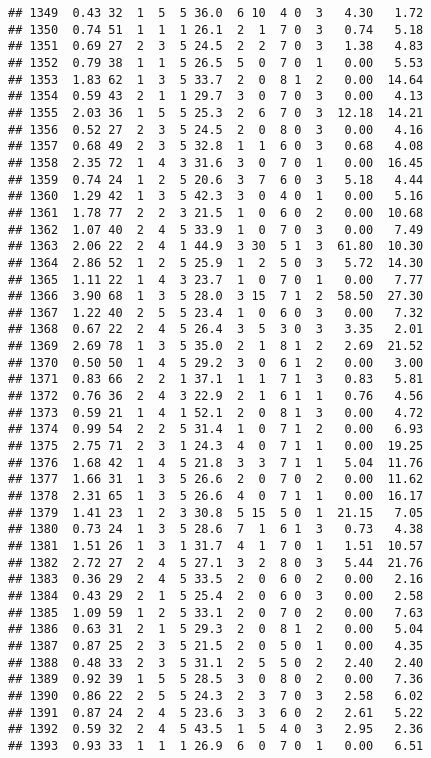\documentclass[
]{article}
\begin{document}
\begin{verbatim}
## 1349  0.43 32  1  5  5 36.0  6 10  4 0  3   4.30   1.72
## 1350  0.74 51  1  1  1 26.1  2  1  7 0  3   0.74   5.18
## 1351  0.69 27  2  3  5 24.5  2  2  7 0  3   1.38   4.83
## 1352  0.79 38  1  1  5 26.5  5  0  7 0  1   0.00   5.53
## 1353  1.83 62  1  3  5 33.7  2  0  8 1  2   0.00  14.64
## 1354  0.59 43  2  1  1 29.7  3  0  7 0  3   0.00   4.13
## 1355  2.03 36  1  5  5 25.3  2  6  7 0  3  12.18  14.21
## 1356  0.52 27  2  3  5 24.5  2  0  8 0  3   0.00   4.16
## 1357  0.68 49  2  3  5 32.8  1  1  6 0  3   0.68   4.08
## 1358  2.35 72  1  4  3 31.6  3  0  7 0  1   0.00  16.45
## 1359  0.74 24  1  2  5 20.6  3  7  6 0  3   5.18   4.44
## 1360  1.29 42  1  3  5 42.3  3  0  4 0  1   0.00   5.16
## 1361  1.78 77  2  2  3 21.5  1  0  6 0  2   0.00  10.68
## 1362  1.07 40  2  4  5 33.9  1  0  7 0  3   0.00   7.49
## 1363  2.06 22  2  4  1 44.9  3 30  5 1  3  61.80  10.30
## 1364  2.86 52  1  2  5 25.9  1  2  5 0  3   5.72  14.30
## 1365  1.11 22  1  4  3 23.7  1  0  7 0  1   0.00   7.77
## 1366  3.90 68  1  3  5 28.0  3 15  7 1  2  58.50  27.30
## 1367  1.22 40  2  5  5 23.4  1  0  6 0  3   0.00   7.32
## 1368  0.67 22  2  4  5 26.4  3  5  3 0  3   3.35   2.01
## 1369  2.69 78  1  3  5 35.0  2  1  8 1  2   2.69  21.52
## 1370  0.50 50  1  4  5 29.2  3  0  6 1  2   0.00   3.00
## 1371  0.83 66  2  2  1 37.1  1  1  7 1  3   0.83   5.81
## 1372  0.76 36  2  4  3 22.9  2  1  6 1  1   0.76   4.56
## 1373  0.59 21  1  4  1 52.1  2  0  8 1  3   0.00   4.72
## 1374  0.99 54  2  2  5 31.4  1  0  7 1  2   0.00   6.93
## 1375  2.75 71  2  3  1 24.3  4  0  7 1  1   0.00  19.25
## 1376  1.68 42  1  4  5 21.8  3  3  7 1  1   5.04  11.76
## 1377  1.66 31  1  3  5 26.6  2  0  7 0  2   0.00  11.62
## 1378  2.31 65  1  3  5 26.6  4  0  7 1  1   0.00  16.17
## 1379  1.41 23  1  2  3 30.8  5 15  5 0  1  21.15   7.05
## 1380  0.73 24  1  3  5 28.6  7  1  6 1  3   0.73   4.38
## 1381  1.51 26  1  3  1 31.7  4  1  7 0  1   1.51  10.57
## 1382  2.72 27  2  4  5 27.1  3  2  8 0  3   5.44  21.76
## 1383  0.36 29  2  4  5 33.5  2  0  6 0  2   0.00   2.16
## 1384  0.43 29  2  1  5 25.4  2  0  6 0  3   0.00   2.58
## 1385  1.09 59  1  2  5 33.1  2  0  7 0  2   0.00   7.63
## 1386  0.63 31  2  1  5 29.3  2  0  8 1  2   0.00   5.04
## 1387  0.87 25  2  3  5 21.5  2  0  5 0  1   0.00   4.35
## 1388  0.48 33  2  3  5 31.1  2  5  5 0  2   2.40   2.40
## 1389  0.92 39  1  5  5 28.5  3  0  8 0  2   0.00   7.36
## 1390  0.86 22  2  5  5 24.3  2  3  7 0  3   2.58   6.02
## 1391  0.87 24  2  4  5 23.6  3  3  6 0  2   2.61   5.22
## 1392  0.59 32  2  4  5 43.5  1  5  4 0  3   2.95   2.36
## 1393  0.93 33  1  1  1 26.9  6  0  7 0  1   0.00   6.51

\end{verbatim}
\end{document}
